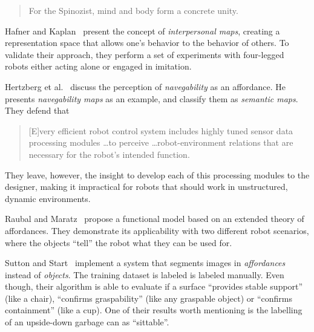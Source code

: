 \documentclass{article}
\begin{document}
\begin{quotation}
  For the Spinozist, mind and body form a concrete unity.
\end{quotation}


Hafner and Kaplan~\cite{hafner2008} present the concept of \emph{interpersonal
maps}, creating a representation space that allows one's behavior to the
behavior of others. To validate their approach, they perform a set of
experiments with four-legged robots either acting alone or engaged in imitation.

Hertzberg et al.~\cite{hertzberg2008} discuss the perception of
\emph{navegability} as an affordance. He presents \emph{navegability maps} as an
example, and classify them as \emph{semantic maps}. They defend that

\begin{quotation}
  [E]very efficient robot control system includes highly tuned sensor data
  processing modules \dots to perceive \dots robot-environment relations that
  are necessary for the robot's intended function.
\end{quotation}

They leave, however, the insight to develop each of this processing modules to
the designer, making it impractical for robots that should work in unstructured,
dynamic environments.

Raubal and Maratz~\cite{raubal2008} propose a functional model based on an
extended theory of affordances. They demonstrate its applicability with two
different robot scenarios, where the objects ``tell'' the robot what they can be
used for. 

Sutton and Start~\cite{sutton2008} implement a system that segments images in
\emph{affordances} instead of \emph{objects}. The training dataset is labeled is
labeled manually. Even though, their algorithm is able to evaluate if a surface
``provides stable support'' (like a chair), ``confirms graspability'' (like any
graspable object) or ``confirms containment'' (like a cup). One of their results
worth mentioning is the labelling of an upside-down garbage can as ``sittable''.
\end{document}
